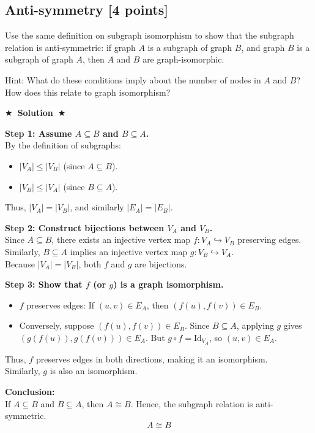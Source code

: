 \documentclass[11pt]{article}
\numberwithin{figure}{section}
\newcommand{\Solution}[1]{{\medskip \color{red} \bf $\bigstar$~\sf \textbf{Solution}~$\bigstar$ \sf #1 } \bigskip}
\begin{document}
\subsection{Anti-symmetry [4 points]}
Use the same definition on subgraph isomorphism to show that the subgraph relation is anti-symmetric: if graph $A$ is a subgraph of graph $B$, and graph $B$ is a subgraph of graph $A$, then $A$ and $B$ are graph-isomorphic.

Hint: What do these conditions imply about the number of nodes in $A$ and $B$? How does this relate to graph isomorphism?

\Solution{}

\textbf{Step 1: Assume $ A \subseteq B $ and $ B \subseteq A $.} \\
By the definition of subgraphs:
\begin{itemize}
    \item $ |V_A| \leq |V_B| $ (since $ A \subseteq B $).
    \item $ |V_B| \leq |V_A| $ (since $ B \subseteq A $).
\end{itemize}
Thus, $ |V_A| = |V_B| $, and similarly $ |E_A| = |E_B| $.

\textbf{Step 2: Construct bijections between $ V_A $ and $ V_B $.} \\
Since $ A \subseteq B $, there exists an injective vertex map $ f: V_A \hookrightarrow V_B $ preserving edges. \\
Similarly, $ B \subseteq A $ implies an injective vertex map $ g: V_B \hookrightarrow V_A $. \\
Because $ |V_A| = |V_B| $, both $ f $ and $ g $ are bijections.

\textbf{Step 3: Show that $ f $ (or $ g $) is a graph isomorphism.} \\
\begin{itemize}
    \item $ f $ preserves edges: If $ (u, v) \in E_A $, then $ (f(u), f(v)) \in E_B $.
    \item Conversely, suppose $ (f(u), f(v)) \in E_B $. Since $ B \subseteq A $, applying $ g $ gives $ (g(f(u)), g(f(v))) \in E_A $. But $ g \circ f = \text{Id}_{V_A} $, so $ (u, v) \in E_A $.
\end{itemize}
Thus, $ f $ preserves edges in both directions, making it an isomorphism. \\
Similarly, $ g $ is also an isomorphism.

\textbf{Conclusion:} \\
If $ A \subseteq B $ and $ B \subseteq A $, then $ A \cong B $. Hence, the subgraph relation is anti-symmetric. \\
\[
\boxed{A \cong B}
\]
\end{document}
